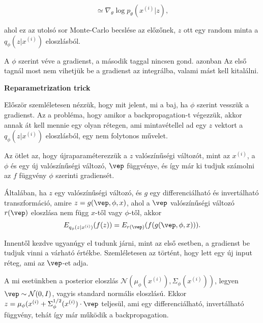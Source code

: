 \documentclass[12pt]{amsart}
\begin{document}
\[
  \simeq \nabla_\theta \log p_{\theta}(x^{(i)}| z),
\]

\vspace{5pt}

ahol ez az utolsó sor Monte-Carlo becslése az előzőnek, $z$
ott egy random minta a $q_{\phi}(z| x^{(i)})$ eloszlásból. 

\vspace{5pt}

A $\phi$ szerint véve a gradienst, a második taggal nincsen
gond. azonban Az első tagnál most nem vihetjük be a
gradienst az integrálba, valami mást kell kitalálni.

\vspace{10pt}

\textbf{Reparametrization trick}

\vspace{10pt}

Először szemléletesen nézzük, hogy mit jelent, mi a baj, ha
$\phi$ szerint vesszük a gradienst. Az a probléma, hogy
amikor a backpropagation-t végezzük, akkor annak át kell
mennie egy olyan rétegen, ami mintavétellel ad egy $z$
vektort a $q_{\phi}(z| x^{(i)})$ eloszlásból, egy nem
folytonos művelet. 

\vspace{5pt}

Az ötlet az, hogy újraparaméterezzük a $z$ valószínűségi
változót, mint az $x^{(i)}$, a $\phi$ és egy új
valószínűségi változó, $\vep$ függvénye, és így már ki
tudjuk számolni az $f$ függvény $\phi$ szerinti gradiensét.

\vspace{5pt}

Általában, ha $z$ egy valószínűségi változó, és $g$ egy
differenciálható és invertálható transzformáció, amire
$z = g(\vep, \phi, x)$, ahol a $\vep$ valószínűségi változó
$r(\vep)$ eloszlása nem függ $x$-től vagy $\phi$-től, akkor
\[
  E_{q_{\phi}(z| x^{(i)})}(f(z)) = E_{r(\vep)}(f(g(\vep,
  \phi, x))).
\]

\vspace{5pt}

Innentől kezdve ugyanúgy el tudunk járni, mint az első
esetben, a gradienst be tudjuk vinni a várható
értékbe. Szemléletesen az történt, hogy lett egy új input
réteg, ami az $\vep$-et adja. 

\vspace{5pt}

A mi esetünkben a posterior eloszlás
$\mathcal{N}(\mu_\phi(x^{(i)}), \Sigma_\phi(x^{(i)}))$,
legyen $\vep \sim \mathcal{N}(0, I)$, vagyis standard
normális eloszlású. Ekkor
$z = \mu_\phi(x^{(i)} + \Sigma_\phi^{1/2}(x^{(i)})\cdot
\vep$ teljesül, ami egy differenciálható, invertálható
függvény, tehát így már működik a backpropagation.
\end{document}
